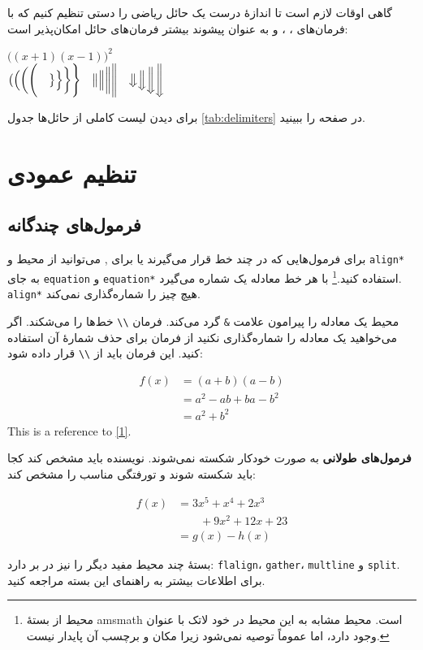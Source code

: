 گاهی اوقات لازم است تا اندازهٔ درست یک حائل ریاضی را دستی تنظیم کنیم 
که با فرمان‌های  ، ،  و 
 به عنوان پیشوند بیشتر فرمان‌های حائل امکان‌پذیر است:
\begin{example}
$\Big((x+1)(x-1)\Big)^{2}$\\
$\big( \Big( \bigg( \Bigg( \quad
\big\} \Big\} \bigg\} \Bigg\} \quad
\big\| \Big\| \bigg\| \Bigg\| \quad
\big\Downarrow \Big\Downarrow 
\bigg\Downarrow \Bigg\Downarrow$
\end{example}
 برای دیدن لیست کاملی از حائل‌ها جدول  
\ref{tab:delimiters}
در صفحه 
\pageref{tab:delimiters} را ببینید. 
\section{تنظیم عمودی}
\subsection{فرمول‌های چندگانه}

برای فرمول‌هایی که در چند خط قرار می‌گیرند یا برای 
 ,
می‌توانید از محیط  و \verb|align*| به جای  \texttt{equation} و \texttt{equation*} استفاده کنید.\footnote{محیط   از بستۀ  \textsf{amsmath} است. محیط مشابه به  این محیط در خود لاتک با عنوان  وجود دارد، اما عموماً توصیه نمی‌شود زیرا مکان و برچسب آن پایدار نیست.} 
با  هر خط معادله یک شماره می‌گیرد. \verb|align*| هیچ چیز را شماره‌گذاری نمی‌کند.

محیط  یک معادله را  پیرامون علامت \verb|&| گرد می‌کند.
فرمان \verb|\\| خط‌ها را می‌شکند. اگر می‌خواهید یک معادله را شماره‌گذاری نکنید از فرمان  برای حذف شمارهٔ آن استفاده کنید. این فرمان باید 
از \verb|\\| قرار داده شود:
\begin{example}
\begin{align}
f(x) &= (a+b)(a-b) \label{1}\\
     &= a^2-ab+ba-b^2  \\ 
     &= a^2+b^2 \tag{wrong}
\end{align}
This is a reference to \eqref{1}.
\end{example}

\textbf{فرمول‌های طولانی} 
به صورت خودکار  شکسته نمی‌شوند. نویسنده باید مشخص کند کجا باید شکسته شوند و تورفتگی مناسب را مشخص کند:
\begin{example}
\begin{align}
f(x) &= 3x^5 + x^4 + 2x^3 
                \nonumber \\
     &\qquad + 9x^2 + 12x + 23 \\
     &= g(x) - h(x)
\end{align}
\end{example}
بستۀ  چند محیط مفید دیگر را نیز در بر دارد: \verb|flalign|،
\verb|gather|، \verb|multline| و \verb|split|. برای اطلاعات بیشتر به راهنمای این بسته مراجعه کنید.
